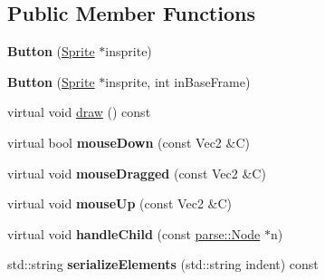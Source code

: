 \subsection*{Public Member Functions}
\begin{DoxyCompactItemize}
\item 
\hypertarget{classg2c_1_1_button_ac7275f502f751cde34c356e50f89e905}{
{\bfseries Button} (\hyperlink{classg2c_1_1_sprite}{Sprite} $\ast$insprite)}
\label{classg2c_1_1_button_ac7275f502f751cde34c356e50f89e905}

\item 
\hypertarget{classg2c_1_1_button_a8147322b847eb93b2b33157fed52cb54}{
{\bfseries Button} (\hyperlink{classg2c_1_1_sprite}{Sprite} $\ast$insprite, int inBaseFrame)}
\label{classg2c_1_1_button_a8147322b847eb93b2b33157fed52cb54}

\item 
virtual void \hyperlink{classg2c_1_1_button_a1d3bfdc06e37d9e533d1cd3b8d308579}{draw} () const 
\item 
\hypertarget{classg2c_1_1_button_a16bef8ab6b3469c521d280862349b9bb}{
virtual bool {\bfseries mouseDown} (const Vec2 \&C)}
\label{classg2c_1_1_button_a16bef8ab6b3469c521d280862349b9bb}

\item 
\hypertarget{classg2c_1_1_button_a6acf69a3fe5c60e1c8e496ec5978d16a}{
virtual void {\bfseries mouseDragged} (const Vec2 \&C)}
\label{classg2c_1_1_button_a6acf69a3fe5c60e1c8e496ec5978d16a}

\item 
\hypertarget{classg2c_1_1_button_adae476cd4698dd217c756d68f2efd168}{
virtual void {\bfseries mouseUp} (const Vec2 \&C)}
\label{classg2c_1_1_button_adae476cd4698dd217c756d68f2efd168}

\item 
\hypertarget{classg2c_1_1_button_a3c5e762a9c71aefd8b63a83554f5b4ad}{
virtual void {\bfseries handleChild} (const \hyperlink{classparse_1_1_node}{parse::Node} $\ast$n)}
\label{classg2c_1_1_button_a3c5e762a9c71aefd8b63a83554f5b4ad}

\item 
\hypertarget{classg2c_1_1_button_a7fa72e8406cbac161f0e349039f31089}{
std::string {\bfseries serializeElements} (std::string indent) const }
\label{classg2c_1_1_button_a7fa72e8406cbac161f0e349039f31089}

\end{DoxyCompactItemize}
